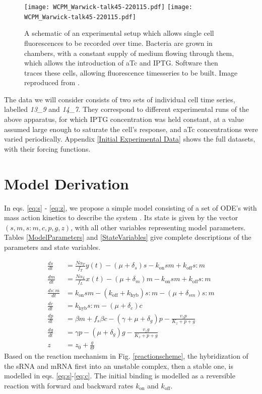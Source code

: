 \documentclass[10pt,journal]{./IEEE_latex_class/IEEEtran}
\begin{document}
\begin{figure}[h]
\centering
\texttt{[image: WCPM\_Warwick-talk45-220115.pdf]}
\centering
\texttt{[image: WCPM\_Warwick-talk45-220115.pdf]}
\caption{A schematic of an experimental setup which allows single cell fluorescences to be recorded over time. Bacteria are grown in chambers, with a constant supply of medium flowing through them, which allows the introduction of aTc and IPTG. Software then traces these cells, allowing fluorescence timesseries to be built.  Image reproduced from \cite{Jaramillo}.}
\label{}
\end{figure}

The data we will consider consists of two sets of individual cell time series, labelled \textit{13\_9} and \textit{14\_7}. They correspond to different experimental runs of the above apparatus, for which IPTG concentration was held constant, at a value assumed large enough to saturate the cell's response, and aTc concentrations were varied periodically. Appendix \ref{Initial  Experimental Data} shows the full datasets, with their forcing functions.




\section{Model Derivation}
\label{Model Derivation}

In eqs. \ref{eq:s} - \ref{eq:z}, we propose a simple model consisting of a set of ODE's with mass action kinetics to describe the system \cite{UriAlon}. Its state is given by the vector $(s,m,s:m,c,p,g,z)$, with all other variables representing model parameters. Tables \ref{ModelParameters} and \ref{StateVariables} give complete descriptions of the parameters and state variables.
 
\begin{align}
\frac{ds}{dt} &= \frac{N\alpha_{T}}{f_{T}} y(t)-(\mu + \delta_{s})s -k_{\mathrm{on}}sm +k_{\mathrm{off}}s:m \label{eq:s}\\
\frac{dm}{dt} &=  \frac{N\alpha_{L}}{f_{L}}x(t)-(\mu + \delta_{m})m -k_{\mathrm{on}}sm +k_{\mathrm{off}}s:m  \label{eq:m}\\
\frac{ds:m}{dt} & = k_{\mathrm{on}}sm  - (k_{\mathrm{off}}+ k_{\mathrm{hyb}})s:m  -(\mu + \delta_{sm} )s:m \label{eq:sm}\\
\frac{dc}{dt} & = k_{\mathrm{hyb}}s:m  -(\mu + \delta_{c})c  \label{eq:c} \\
\frac{dp}{dt} & = \beta m +f_{s}\beta c -(\gamma + \mu + \delta_{g})p - \frac{v_{z}p}{K_{z}+p+g}  \label{eq:p} \\
\frac{dg}{dt} & = \gamma p - (\mu + \delta_{g})g - \frac{v_{z}g}{K_{z}+p+g} \label{eq:g} \\
z &= z_{0} +\frac{g}{\Theta} \label{eq:z}
\end{align}
  Based on the reaction mechanism in Fig. \ref{reactionscheme}, the hybridization of the sRNA and mRNA first into an unstable complex, then a stable one, is modelled in eqs. \ref{eq:s}-\ref{eq:c}. The initial binding is modelled as a reversible reaction with forward and backward rates $k_\mathrm{on}$ and $k_\mathrm{off}$.
  
\end{document}
